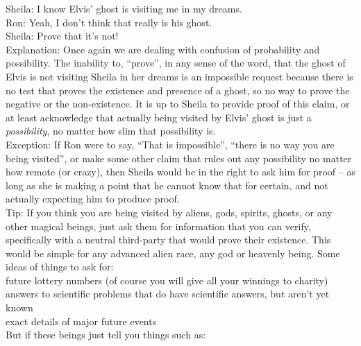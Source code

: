 \documentclass[a4paper,12pt,single,pdftex]{scrbook}
\begin{document}
    
      Sheila: I know Elvis’ ghost is visiting me in my dreams.
    \\

    
      Ron: Yeah, I don’t think that really is his ghost.
    \\

    
      Sheila: Prove that it’s not!
    \\

    
      Explanation: Once again we are dealing with confusion of probability and possibility.  The inability to, “prove”, in any sense of the word, that the ghost of Elvis is not visiting Sheila in her dreams is an impossible request because there is no test that proves the existence and presence of a ghost, so no way to prove the negative or the non-existence.  It is up to Sheila to provide proof of this claim, or at least acknowledge that actually being visited by Elvis’ ghost is just a {\it possibility}, no matter how slim that possibility is.
    \\

    
      Exception: If Ron were to say, “That is impossible”, “there is no way you are being visited”, or make some other claim that rules out any possibility no matter how remote (or crazy), then Sheila would be in the right to ask him for proof -- as long as she is making a point that he cannot know that for certain, and not actually expecting him to produce proof.
    \\

    
      Tip: If you think you are being visited by aliens, gods, spirits, ghosts, or any other magical beings, just ask them for information that you can verify, specifically with a neutral third-party that would prove their existence.  This would be simple for any advanced alien race, any god or heavenly being.  Some ideas of things to ask for:
    \\

    
      future lottery numbers (of course you will give all your winnings to charity)
    \\

    
      answers to scientific problems that do have scientific answers, but aren’t yet known
    \\

    
      exact details of major future events
    \\

    
      But if these beings just tell you things such as:
    \\
\end{document}
